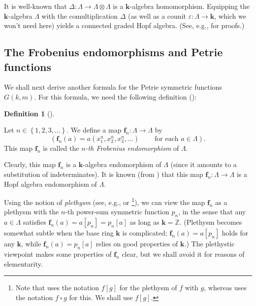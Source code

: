 \documentclass[numbers=enddot,12pt,final,onecolumn,notitlepage]{scrartcl}%
\theoremstyle{definition}
\newtheorem{defi}[theo]{Definition}
\newenvironment{definition}[1][]
{\begin{defi}[#1]\begin{leftbar}}
{\end{leftbar}\end{defi}}
\begin{document}
It is well-known that $\Delta:\Lambda\rightarrow\Lambda\otimes\Lambda$ is a
$\mathbf{k}$-algebra homomorphism. Equipping the $\mathbf{k}$-algebra
$\Lambda$ with the comultiplication $\Delta$ (as well as a counit
$\varepsilon:\Lambda\rightarrow\mathbf{k}$, which we won't need here) yields a
connected graded Hopf algebra. (See, e.g., \cite[\S 2.1]{GriRei} for proofs.)

\subsection{The Frobenius endomorphisms and Petrie functions}

We shall next derive another formula for the Petrie symmetric functions
$G\left(  k,m\right)  $. For this formula, we need the following definition
(\cite[Exercise 2.9.9]{GriRei}):

\begin{definition}
\label{def.fn}Let $n\in\left\{  1,2,3,\ldots\right\}  $. We define a map
$\mathbf{f}_{n}:\Lambda\rightarrow\Lambda$ by%
\[
\left(  \mathbf{f}_{n}\left(  a\right)  =a\left(  x_{1}^{n},x_{2}^{n}%
,x_{3}^{n},\ldots\right)  \ \ \ \ \ \ \ \ \ \ \text{for each }a\in
\Lambda\right)  .
\]
This map $\mathbf{f}_{n}$ is called the $n$\emph{-th Frobenius endomorphism}
of $\Lambda$.
\end{definition}

Clearly, this map $\mathbf{f}_{n}$ is a $\mathbf{k}$-algebra endomorphism of
$\Lambda$ (since it amounts to a substitution of indeterminates). It is known
(from \cite[Exercise 2.9.9(d)]{GriRei}) that this map $\mathbf{f}_{n}%
:\Lambda\rightarrow\Lambda$ is a Hopf algebra endomorphism of $\Lambda$.

Using the notion of \emph{plethysm} (see, e.g., \cite[Chapter 7, Definition
A2.6]{Stanley-EC2} or \cite[\S I.8]{Macdon95}\footnote{Note that
\cite{Stanley-EC2} uses the notation $f\left[  g\right]  $ for the plethysm of
$f$ with $g$, whereas \cite{Macdon95} uses the notation $f\circ g$ for this.
We shall use $f\left[  g\right]  $.}), we can view the map $\mathbf{f}_{n}$ as
a plethysm with the $n$-th power-sum symmetric function $p_{n}$, in the sense
that any $a\in\Lambda$ satisfies $\mathbf{f}_{n}\left(  a\right)  =a\left[
p_{n}\right]  =p_{n}\left[  a\right]  $ as long as $\mathbf{k}=\mathbb{Z}$.
(Plethysm becomes somewhat subtle when the base ring $\mathbf{k}$ is
complicated; $\mathbf{f}_{n}\left(  a\right)  =a\left[  p_{n}\right]  $ holds
for any $\mathbf{k}$, while $\mathbf{f}_{n}\left(  a\right)  =p_{n}\left[
a\right]  $ relies on good properties of $\mathbf{k}$.) The plethystic
viewpoint makes some properties of $\mathbf{f}_{n}$ clear, but we shall avoid
it for reasons of elementarity.
\end{document}
